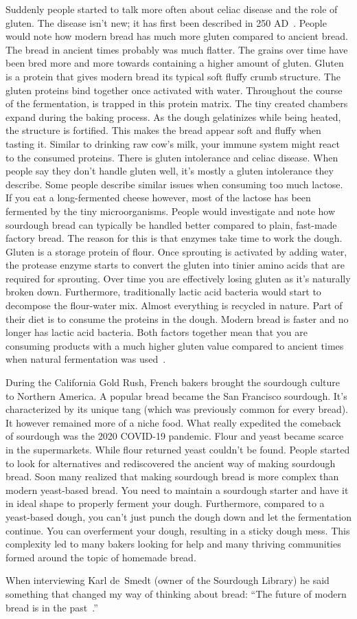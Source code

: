 Suddenly people started to talk more often about celiac disease
and the role of gluten. The disease isn't new; it has first
been described in 250 AD~\cite{coeliac+disease}. People
would note how modern bread has much more gluten compared
to ancient bread. The bread in ancient times probably was much flatter.
The grains over time have been bred more and more towards containing a higher
amount of gluten. Gluten is a protein that gives modern
bread its typical soft fluffy crumb structure. The
gluten proteins bind together once activated with water.
Throughout the course of the fermentation,  is trapped
in this protein matrix. The tiny created chambers expand
during the baking process. As the dough gelatinizes while
being heated, the structure is fortified. This makes the bread appear
soft and fluffy when tasting it. Similar to drinking raw cow's milk,
your immune system might react to the consumed proteins.
There is gluten intolerance
and celiac disease. When people say they don't handle
gluten well, it's mostly a gluten intolerance they describe.
Some people describe similar issues when consuming
too much lactose. If you eat a long-fermented cheese
however, most of the lactose has been fermented by
the tiny microorganisms. People would investigate and
note how sourdough bread can typically be handled better
compared to plain, fast-made factory bread. The
reason for this is that enzymes take time to work the dough.
Gluten is a storage protein of flour. Once
sprouting is activated by adding water, the protease
enzyme starts to convert the gluten into tinier amino acids
that are required for sprouting. Over time you are effectively
losing gluten as it's naturally broken down. Furthermore,
traditionally lactic acid bacteria would start to decompose
the flour-water mix. Almost everything is recycled in nature.
Part of their diet is to consume the proteins in the dough.
Modern bread is faster and no longer has lactic acid bacteria.
Both factors together mean that you are consuming products
with a much higher gluten value compared to ancient times
when natural fermentation was used~\cite{raffaella+di+cagno}.

During the California Gold Rush, French bakers brought the sourdough
culture to Northern America. A popular bread became the
San Francisco sourdough. It's characterized by its unique
tang (which was previously common for every bread). It
however remained more of a niche food. What really expedited
the comeback of sourdough was the 2020 COVID-19 pandemic.
Flour and yeast became scarce in the supermarkets. While
flour returned yeast couldn't be found. People started
to look for alternatives and rediscovered the ancient
way of making sourdough bread. Soon many realized
that making sourdough bread is more complex than modern
yeast-based bread. You need to maintain a sourdough starter
and have it in ideal shape to properly ferment your dough.
Furthermore, compared to a yeast-based dough, you can't just
punch the dough down and let the fermentation continue.
You can overferment your dough, resulting in a sticky
dough mess. This complexity led to many bakers looking
for help and many thriving communities formed around
the topic of homemade bread.

When interviewing Karl de~Smedt (owner of the Sourdough
Library) he said something that changed my way of thinking
about bread: ``The future of
modern bread is in the past~\cite{interview+karl+de+smedt}.''
